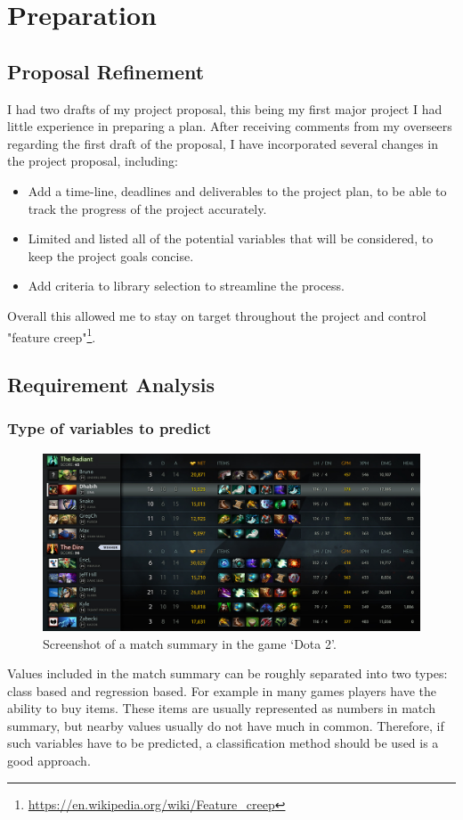 \documentclass[12pt,a4paper]{book}
\begin{document}
\chapter{Preparation}
\section{Proposal Refinement}
I had two drafts of my project proposal, this being my first major project I had little experience in preparing a plan.
After receiving comments from my overseers regarding the first draft of the proposal, I have incorporated several changes in the project proposal, including:
\begin{itemize}
\item Add a time-line, deadlines and deliverables to the project plan, to be able to track the progress of the project accurately.
\item Limited and listed all of the potential variables that will be considered, to keep the project goals concise.
\item Add criteria to library selection to streamline the process.
\end{itemize}
Overall this allowed me to stay on target throughout the project and control "feature creep"\footnote{\url{https://en.wikipedia.org/wiki/Feature_creep}}.
\section{Requirement Analysis}
\subsection{Type of variables to predict}
\begin{figure}[ht]
\centering
\includegraphics[scale=0.39]{results-summary}
\caption{Screenshot of a match summary in the game `Dota 2'.}
\label{fig:results-summary}
\end{figure}
Values included in the match summary can be roughly separated into two types: class based and regression based.
For example in many games players have the ability to buy items.
These items are usually represented as numbers in match summary, but nearby values usually do not have much in common.
Therefore, if such variables have to be predicted, a classification method should be used is a good approach.
\end{document}

